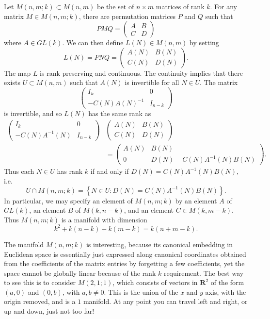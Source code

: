 \begin{example}
    Let $M(n,m;k) \subset M(n,m)$ be the set of $n \times m$ matrices of rank $k$. For any matrix $M \in M(n,m;k)$, there are permutation matrices $P$ and $Q$ such that
    \[ PMQ = \begin{pmatrix} A & B \\ C & D \end{pmatrix} \]
    where $A \in GL(k)$. We can then define $L(N) \in M(n,m)$ by setting
    \[ L(N) = PNQ = \begin{pmatrix} A(N) & B(N) \\ C(N) & D(N) \end{pmatrix}. \]
    The map $L$ is rank preserving and continuous. The continuity implies that there exists $U \subset M(n,m)$ such that $A(N)$ is invertible for all $N \in U$. The matrix
    \[ \begin{pmatrix} I_k & 0 \\ -C(N)A(N)^{-1} & I_{n-k} \end{pmatrix} \]
    is invertible, and so $L(N)$ has the same rank as
    \begin{align*}
        \begin{pmatrix} I_k & 0 \\ -C(N)A^{-1}(N) & I_{n-k} \end{pmatrix} &\begin{pmatrix} A(N) & B(N) \\ C(N) & D(N) \end{pmatrix}\\
        &= \begin{pmatrix} A(N) & B(N) \\ 0 & D(N) - C(N)A^{-1}(N)B(N) \end{pmatrix}.
    \end{align*}
    Thus each $N \in U$ has rank $k$ if and only if $D(N) = C(N)A^{-1}(N)B(N)$, i.e.
    \[ U \cap M(n,m;k) = \left\{ N \in U : D(N) = C(N) A^{-1}(N) B(N) \right\}. \]
    In particular, we may specify an element of $M(n,m;k)$ by an element $A$ of $GL(k)$, an element $B$ of $M(k,n-k)$, and an element $C \in M(k,m-k)$. Thus $M(n,m;k)$ is a manifold with dimension
    \[ k^2 + k(n-k) + k(m-k) = k(n+m-k). \]
\end{example}

The manifold $M(n,m;k)$ is interesting, because its canonical embedding in Euclidean space is essentially just expressed along canonical coordinates obtained from the coefficients of the matrix entries by forgetting a few coefficients, yet the space cannot be globally linear because of the rank $k$ requirement. The best way to see this is to consider $M(2,1;1)$, which consists of vectors in $\mathbf{R}^2$ of the form $(a,0)$ and $(0,b)$, with $a,b \neq 0$. This is the union of the $x$ and $y$ axis, with the origin removed, and is a $1$ manifold. At any point you can travel left and right, or up and down, just not too far!

